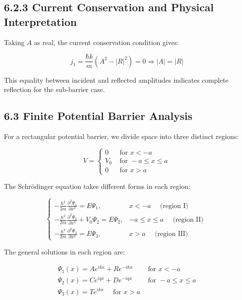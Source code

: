 \documentclass[10pt]{article}
\begin{document}
\subsection*{6.2.3 Current Conservation and Physical Interpretation}

Taking $A$ as real, the current conservation condition gives:

\begin{equation*}
j_{1}=\frac{\hbar k}{m}\left(A^{2}-|R|^{2}\right)=0 \Longrightarrow|A|=|R| \tag{6.49}
\end{equation*}

This equality between incident and reflected amplitudes indicates complete reflection for the sub-barrier case.

\subsection*{6.3 Finite Potential Barrier Analysis}

For a rectangular potential barrier, we divide space into three distinct regions:

\[
V= \begin{cases}0 & \text { for } x<-a  \tag{6.50}\\ V_{0} & \text { for }-a \leq x \leq a \\ 0 & \text { for } x>a\end{cases}
\]

The Schrödinger equation takes different forms in each region:

\[
\begin{cases}-\frac{\hbar^{2}}{2 m} \frac{\partial^{2} \Psi_{1}}{\partial x^{2}}=E \Psi_{1}, & x<-a \quad \text { (region I) }  \tag{6.51}\\ -\frac{\hbar^{2}}{2 m} \frac{\partial^{2} \Psi_{2}}{\partial x^{2}}+V_{0} \Psi_{2}=E \Psi_{2}, & -a \leq x \leq a \quad \text { (region II) } \\ -\frac{\hbar^{2}}{2 m} \frac{\partial^{2} \Psi_{3}}{\partial x^{2}}=E \Psi_{3}, & x>a \quad \text { (region III) }\end{cases}
\]

The general solutions in each region are:

\[
\begin{array}{ll}
\Psi_{1}(x)=A e^{i k x}+R e^{-i k x} & \text { for } x<-a \\
\Psi_{2}(x)=C e^{i q x}+D e^{-i q x} & \text { for }-a \leq x \leq a  \tag{6.52}\\
\Psi_{3}(x)=T e^{i k x} \quad \text { for } x>a &
\end{array}
\]
\end{document}
